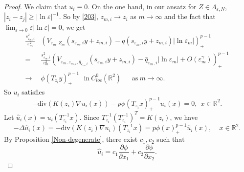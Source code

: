 \documentclass[12pt,reqno]{amsart}
\numberwithin{equation}{section}
\theoremstyle{definition}
\theoremstyle{remark}
\begin{document}
\begin{proof}
We claim that $ u_i\equiv 0. $ On the one hand, in our ansatz for $ Z\in \Lambda_{\varepsilon, N} $, $ |z_i-z_j|\geq |\ln\varepsilon|^{-1} $. So by \eqref{203}, $ z_{m,i}\to z_i $ as $ m\to\infty $ and the fact that $ \lim_{\varepsilon\to 0}\varepsilon|\ln\varepsilon|=0 $, we get
\begin{equation*}
\begin{split}
\frac{s_{\varepsilon_m,i}^2}{\varepsilon_m^2}&\left (V_{\varepsilon_m, Z_m}(s_{\varepsilon_m, i}y+z_{m,i})-q\left (s_{\varepsilon_m, i}y+z_{m,i}\right )|\ln\varepsilon_m|\right )^{p-1}_+\\
=&\frac{s_{\varepsilon_m,i}^2}{\varepsilon_m^2}\left( V_{\varepsilon_m, z_{m,i}, \hat{q}_{\varepsilon_m,i}}(s_{\varepsilon_m, i}y+z_{m,i})-\hat{q}_{\varepsilon_m,i}|\ln\varepsilon_m|+O\left (\varepsilon_m^{\gamma}\right )\right)^{p-1}_+ \\
\to&\phi(T_{z_i}y)^{p-1}_+\ \  \  \text{in}\ C^0_{loc}(\mathbb{R}^2)\ \ \ \ \ \ \  \text{as}\ m\to\infty.
\end{split}
\end{equation*}
So $ u_i $ satisfies
\begin{equation*}
-\text{div}(K(z_i)\nabla u_i(x))-p\phi(T_{z_i}x)^{p-1}_+u_i(x)=0,\ \ x\in\mathbb{R}^2.
\end{equation*}
Let $ \hat{u}_i(x)=u_i(T_{z_i}^{-1}x) $. Since $ T_{z_i}^{-1}(T_{z_i}^{-1})^T=K(z_i) $, we have
\begin{equation*}
-\Delta \hat{u}_i(x)=-\text{div}(K(z_i)\nabla u_i)(T_{z_i}^{-1}x)=p\phi(x)^{p-1}_+\hat{u}_i(x),\ \ \ \   \ x\in \mathbb{R}^2.
\end{equation*}
By Proposition \ref{Non-degenerate}, there exist $ c_1,c_2 $ such that
\begin{equation}\label{210}
\hat{u}_i=c_1\frac{\partial \phi}{\partial x_1}+c_2\frac{\partial \phi}{\partial x_2}.
\end{equation}


\end{proof}
\end{document}
